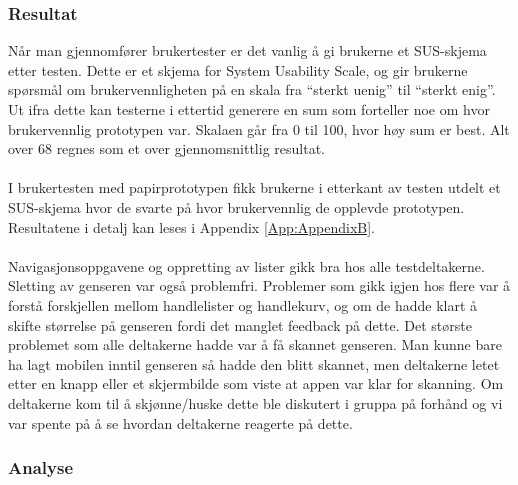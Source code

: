 \subsubsection{Resultat}
Når man gjennomfører brukertester er det vanlig å gi brukerne et SUS-skjema etter testen. Dette er et skjema for System Usability Scale, og gir brukerne spørsmål om brukervennligheten på en skala fra “sterkt uenig” til “sterkt enig”\cite{usability}. Ut ifra dette kan testerne i ettertid generere en sum som forteller noe om hvor brukervennlig prototypen var. Skalaen går fra 0 til 100, hvor høy sum er best. Alt over 68 regnes som et over gjennomsnittlig resultat.
\\\\
I brukertesten med papirprototypen fikk brukerne i etterkant av testen utdelt et SUS-skjema hvor de svarte på hvor brukervennlig de opplevde prototypen. Resultatene i detalj kan leses i Appendix \ref{App:AppendixB}.
\\\\
Navigasjonsoppgavene og oppretting av lister gikk bra hos alle testdeltakerne. Sletting av genseren var også problemfri. Problemer som gikk igjen hos flere var å forstå forskjellen mellom handlelister og handlekurv, og om de hadde klart å skifte størrelse på genseren fordi det manglet feedback på dette. Det største problemet som alle deltakerne hadde var å få skannet genseren. Man kunne bare ha lagt mobilen inntil genseren så hadde den blitt skannet, men deltakerne letet etter en knapp eller et skjermbilde som viste at appen var klar for skanning. Om deltakerne kom til å skjønne/huske dette ble diskutert i gruppa på forhånd og vi var spente på å se hvordan deltakerne reagerte på dette.

\subsubsection{Analyse}

